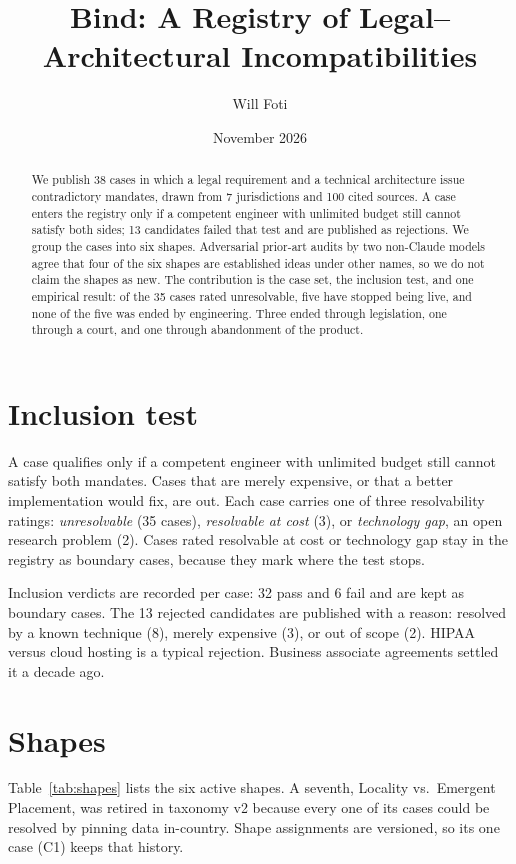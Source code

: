 \documentclass[10pt,twocolumn]{article}
\title{Bind: A Registry of Legal--Architectural Incompatibilities}
\author{Will Foti}
\date{November 2026}
\begin{document}
\maketitle

\begin{abstract}
We publish 38 cases in which a legal requirement and a technical architecture
issue contradictory mandates, drawn from 7 jurisdictions and 100 cited sources.
A case enters the registry only if a competent engineer with unlimited budget
still cannot satisfy both sides; 13 candidates failed that test and are
published as rejections. We group the cases into six shapes. Adversarial
prior-art audits by two non-Claude models agree that four of the six shapes are
established ideas under other names, so we do not claim the shapes as new. The
contribution is the case set, the inclusion test, and one empirical result:
of the 35 cases rated unresolvable, five have stopped being live, and none of
the five was ended by engineering. Three ended through legislation, one through
a court, and one through abandonment of the product.
\end{abstract}

\section{Inclusion test}

A case qualifies only if a competent engineer with unlimited budget still
cannot satisfy both mandates. Cases that are merely expensive, or that a better
implementation would fix, are out. Each case carries one of three
resolvability ratings: \emph{unresolvable} (35 cases), \emph{resolvable at
cost} (3), or \emph{technology gap}, an open research problem (2). Cases
rated resolvable at cost or technology gap stay in the registry as boundary
cases, because they mark where the test stops.

Inclusion verdicts are recorded per case: 32 pass and 6 fail and are kept as
boundary cases. The 13 rejected candidates are published
with a reason: resolved by a known technique (8), merely expensive (3), or out
of scope (2). HIPAA versus cloud hosting is a typical rejection. Business
associate agreements settled it a decade ago.

\section{Shapes}

Table~\ref{tab:shapes} lists the six active shapes. A seventh, Locality
vs.\ Emergent Placement, was retired in taxonomy v2 because every one of its
cases could be resolved by pinning data in-country. Shape assignments are
versioned, so its one case (C1) keeps that history.
\end{document}
